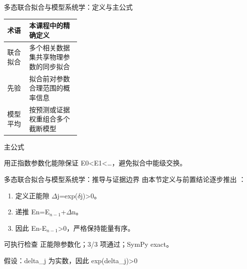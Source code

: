 \begin{frame}[t]{多态联合拟合与模型系统学：定义与主公式}
\footnotesize\begin{tabularx}{\linewidth}{p{0.30\linewidth}Y}
\toprule 术语 & 本课程中的精确定义\\\midrule
{} 联合拟合 & 多个相关数据集共享物理参数的同步拟合\\
 先验 & 拟合前对参数合理范围的概率信息\\
 模型平均 & 按预测或证据权重组合多个截断模型\\
\bottomrule\end{tabularx}\vspace{0.15cm}
\begin{block}{ 主公式}\centering{}\end{block}
用正指数参数化能隙保证 E0<E1<…，避免拟合中能级交换。
\end{frame}

\begin{frame}[t]{多态联合拟合与模型系统学：推导与证据边界}
\footnotesize
{}\quad 由本节定义与前置结论逐步推出 ：
\begin{enumerate}
\item 定义正能隙 \ensuremath{\Delta}j=exp(\ensuremath{\delta}j)>0。
\item 递推 En=E\ensuremath{_{n-1}}+\ensuremath{\Delta}n。
\item 因此 En-E\ensuremath{_{n-1}}>0，严格保持能量有序。
\end{enumerate}\begin{block}{可执行检查}
\quad 正能隙参数化；3/3 项通过；SymPy exact。
\par\scriptsize 假设：delta\_j 为实数，因此 exp(delta\_j)>0
\end{block}
\end{frame}


